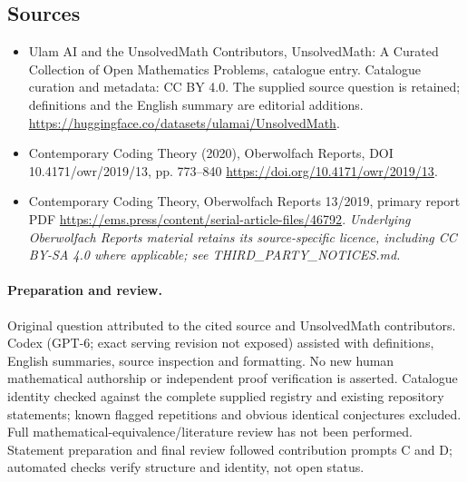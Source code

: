 \documentclass[11pt]{article}
\begin{document}
\subsection{Sources}
\begin{itemize}
\item[\hypertarget{source:statement:1}{S1}] Ulam AI and the UnsolvedMath Contributors, UnsolvedMath: A Curated Collection of Open Mathematics Problems, catalogue entry. Catalogue curation and metadata: CC BY 4.0. The supplied source question is retained; definitions and the English summary are editorial additions.
\url{https://huggingface.co/datasets/ulamai/UnsolvedMath}.
\item[\hypertarget{source:statement:2}{S2}] Contemporary Coding Theory (2020), Oberwolfach Reports, DOI 10.4171/owr/2019/13, pp. 773--840
\url{https://doi.org/10.4171/owr/2019/13}.
\item[\hypertarget{source:statement:3}{S3}] Contemporary Coding Theory, Oberwolfach Reports 13/2019, primary report PDF
\url{https://ems.press/content/serial-article-files/46792}.
\textit{Underlying Oberwolfach Reports material retains its source-specific licence, including CC BY-SA 4.0 where applicable; see THIRD\_PARTY\_NOTICES.md.}
\end{itemize}
\paragraph{Preparation and review.}
Original question attributed to the cited source and UnsolvedMath contributors. Codex (GPT-6; exact serving revision not exposed) assisted with definitions, English summaries, source inspection and formatting. No new human mathematical authorship or independent proof verification is asserted. Catalogue identity checked against the complete supplied registry and existing repository statements; known flagged repetitions and obvious identical conjectures excluded. Full mathematical-equivalence/literature review has not been performed. Statement preparation and final review followed contribution prompts C and D; automated checks verify structure and identity, not open status.
\label{end:statement}
\end{document}
